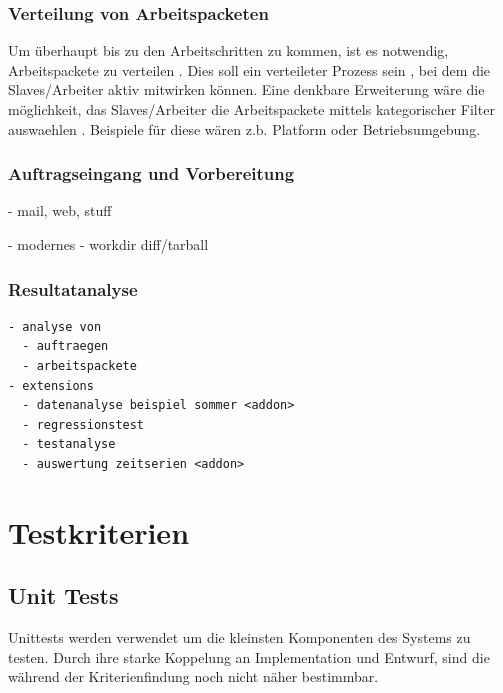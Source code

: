 \subsubsection{Verteilung von Arbeitspacketen}

Um \"uberhaupt bis zu den Arbeitschritten zu kommen,
ist es notwendig, Arbeitspackete zu verteilen .
Dies soll ein verteileter Prozess sein ,
bei dem die Slaves/Arbeiter aktiv mitwirken k\"onnen.
Eine denkbare Erweiterung w\"are die m\"oglichkeit, das Slaves/Arbeiter
die Arbeitspackete mittels kategorischer Filter auswaehlen .
Beispiele f\"ur diese w\"aren z.b. Platform oder Betriebsumgebung.

\subsubsection{Auftragseingang und Vorbereitung}

- mail, web, stuff

- modernes
  - workdir diff/tarball

\subsubsection{Resultatanalyse}


\begin{verbatim}
- analyse von
  - auftraegen
  - arbeitspackete
- extensions
  - datenanalyse beispiel sommer <addon>
  - regressionstest
  - testanalyse
  - auswertung zeitserien <addon>
\end{verbatim}





\section{Testkriterien}
\subsection{Unit Tests}

Unittests werden verwendet um die kleinsten Komponenten des Systems zu testen.
Durch ihre starke Koppelung an Implementation und Entwurf,
sind die w\"ahrend der Kriterienfindung noch nicht n\"aher bestimmbar.

